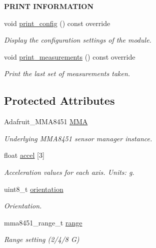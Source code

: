 \begin{Indent}{\bf P\+R\+I\+NT I\+N\+F\+O\+R\+M\+A\+T\+I\+ON}\par
\begin{DoxyCompactItemize}
\item 
void \hyperlink{class_loom___m_m_a8451_aad7bfbb26c8dd4eadd61e9a4817e6930}{print\+\_\+config} () const override
\begin{DoxyCompactList}\small\item\em Display the configuration settings of the module. \end{DoxyCompactList}\item 
void \hyperlink{class_loom___m_m_a8451_a9570d87217ecf046b32ac9d8fa07abcf}{print\+\_\+measurements} () const override
\begin{DoxyCompactList}\small\item\em Print the last set of measurements taken. \end{DoxyCompactList}\end{DoxyCompactItemize}
\end{Indent}
\subsection*{Protected Attributes}
\begin{DoxyCompactItemize}
\item 
Adafruit\+\_\+\+M\+M\+A8451 \hyperlink{class_loom___m_m_a8451_a748213c00e6b00cac365e936a97c54d7}{M\+MA}
\begin{DoxyCompactList}\small\item\em Underlying M\+M\+A8451 sensor manager instance. \end{DoxyCompactList}\item 
float \hyperlink{class_loom___m_m_a8451_a4fbceda7e98b971a800aeb7c09ce7670}{accel} \mbox{[}3\mbox{]}
\begin{DoxyCompactList}\small\item\em Acceleration values for each axis. Units\+: g. \end{DoxyCompactList}\item 
uint8\+\_\+t \hyperlink{class_loom___m_m_a8451_afaa9b009ce6745e7c74ef030630e751e}{orientation}
\begin{DoxyCompactList}\small\item\em Orientation. \end{DoxyCompactList}\item 
mma8451\+\_\+range\+\_\+t \hyperlink{class_loom___m_m_a8451_a8d48bf01b43b936b5364b13e5c64d242}{range}
\begin{DoxyCompactList}\small\item\em Range setting (2/4/8 G) \end{DoxyCompactList}\end{DoxyCompactItemize}
